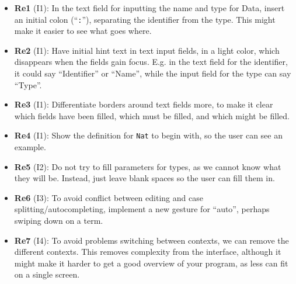 \begin{itemize}
	\item \textbf{Re1} (I1): In the text field for inputting the name and type for Data, insert an initial colon (``\texttt{:}''), separating the identifier from the type. This might make it easier to see what goes where.
	\item \textbf{Re2} (I1): Have initial hint text in text input fields, in a light color, which disappears when the fields gain focus. E.g. in the text field for the identifier, it could say ``Identifier'' or ``Name'', while the input field for the type can say ``Type''.
	\item \textbf{Re3} (I1): Differentiate borders around text fields more, to make it clear which fields have been filled, which must be filled, and which might be filled.
	\item \textbf{Re4} (I1): Show the definition for \texttt{Nat} to begin with, so the user can see an example.
	\item \textbf{Re5} (I2): Do not try to fill parameters for types, as we cannot know what they will be. Instead, just leave blank spaces so the user can fill them in.
	\item \textbf{Re6} (I3): To avoid conflict between editing and case splitting/autocompleting, implement a new gesture for ``auto'', perhaps swiping down on a term.
	\item \textbf{Re7} (I4): To avoid problems switching between contexts, we can remove the different contexts. This removes complexity from the interface, although it might make it harder to get a good overview of your program, as less can fit on a single screen.
\end{itemize}
